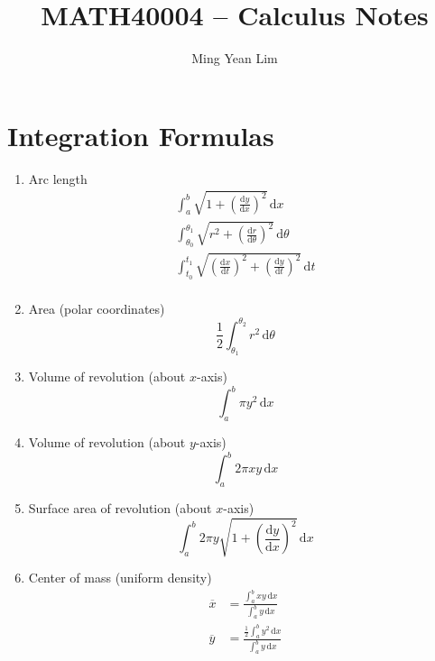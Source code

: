 \documentclass{article}
\title{MATH40004 -- Calculus Notes}
\author{Ming Yean Lim}
\date{}
\begin{document}
\maketitle

\section{Integration Formulas}

\begin{enumerate}
    \item Arc length
    \begin{gather*}
        \int_a^b \sqrt{1 + \left( \frac{\mathrm{d} y}{\mathrm{d} x} \right)^2} \, \mathrm{d} x \\
        \int_{\theta_0}^{\theta_1} \sqrt{r^2 + \left( \frac{\mathrm{d} r}{\mathrm{d} \theta} \right)^2} \, \mathrm{d} \theta \\
        \int_{t_0}^{t_1} \sqrt{\left( \frac{\mathrm{d} x}{\mathrm{d} t} \right)^2 + \left( \frac{\mathrm{d} y}{\mathrm{d} t} \right)^2 } \, \mathrm{d} t \\
    \end{gather*}
    \item Area (polar coordinates)
    \begin{equation*}
        \frac{1}{2} \int_{\theta_1}^{\theta_2} r^2 \, \mathrm{d} \theta
    \end{equation*}
    \item Volume of revolution (about $x$-axis)
    \begin{equation*}
        \int_a^b \pi y^2 \, \mathrm{d} x
    \end{equation*}
    \item Volume of revolution (about $y$-axis)
    \begin{equation*}
        \int_a^b 2 \pi x y \, \mathrm{d} x
    \end{equation*}
    \item Surface area of revolution (about $x$-axis)
    \begin{equation*}
        \int_a^b 2 \pi y \sqrt{1 + \left( \frac{\mathrm{d} y}{\mathrm{d} x} \right)^2} \, \mathrm{d} x
    \end{equation*}
    \item Center of mass (uniform density)
    \begin{align*}
        \overline{x} &= \frac{\int_a^b x y \, \mathrm{d} x}{\int_a^b y \, \mathrm{d} x} \\
        \overline{y} &= \frac{\frac{1}{2} \int_a^b y^2 \, \mathrm{d} x}{\int_a^b y \, \mathrm{d} x}
    \end{align*}
\end{enumerate}
\end{document}
